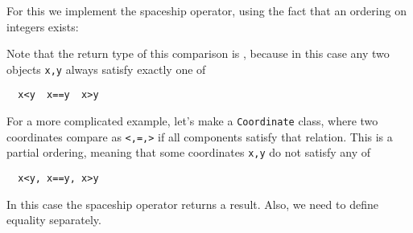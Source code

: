 For this we implement the spaceship operator,
using the fact that an ordering on integers exists:

Note that the return type of this comparison is
,
because in this case any two objects \lstinline{x,y}
always satisfy exactly one of
\begin{lstlisting}
  x<y  x==y  x>y
\end{lstlisting}

For a more complicated example, let's make a \lstinline{Coordinate} class,
where two coordinates compare as
\lstinline|<,=,>|
if all components satisfy that relation.
This is a partial ordering,
meaning that some coordinates \lstinline{x,y}
do not satisfy any of
\begin{lstlisting}
  x<y, x==y, x>y
\end{lstlisting}

In this case the spaceship operator returns a
 result.
Also, we need to define equality separately.
